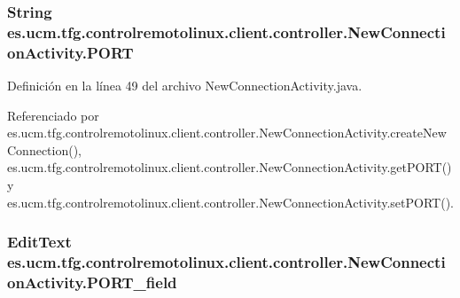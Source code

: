 \hypertarget{classes_1_1ucm_1_1tfg_1_1controlremotolinux_1_1client_1_1controller_1_1NewConnectionActivity_a28de48a3f946023e08bae98f988b16a9}{
\subsubsection[{P\-O\-R\-T}]{\setlength{\rightskip}{0pt plus 5cm}String es.\-ucm.\-tfg.\-controlremotolinux.\-client.\-controller.\-New\-Connection\-Activity.\-P\-O\-R\-T\hspace{0.3cm}{\ttfamily [private]}}}\label{classes_1_1ucm_1_1tfg_1_1controlremotolinux_1_1client_1_1controller_1_1NewConnectionActivity_a28de48a3f946023e08bae98f988b16a9}


Definición en la línea 49 del archivo New\-Connection\-Activity.\-java.



Referenciado por es.\-ucm.\-tfg.\-controlremotolinux.\-client.\-controller.\-New\-Connection\-Activity.\-create\-New\-Connection(), es.\-ucm.\-tfg.\-controlremotolinux.\-client.\-controller.\-New\-Connection\-Activity.\-get\-P\-O\-R\-T() y es.\-ucm.\-tfg.\-controlremotolinux.\-client.\-controller.\-New\-Connection\-Activity.\-set\-P\-O\-R\-T().

\hypertarget{classes_1_1ucm_1_1tfg_1_1controlremotolinux_1_1client_1_1controller_1_1NewConnectionActivity_abe571af8247d1ef78a0c0ed5edaf3308}{
\subsubsection[{P\-O\-R\-T\-\_\-field}]{\setlength{\rightskip}{0pt plus 5cm}Edit\-Text es.\-ucm.\-tfg.\-controlremotolinux.\-client.\-controller.\-New\-Connection\-Activity.\-P\-O\-R\-T\-\_\-field\hspace{0.3cm}{\ttfamily [private]}}}\label{classes_1_1ucm_1_1tfg_1_1controlremotolinux_1_1client_1_1controller_1_1NewConnectionActivity_abe571af8247d1ef78a0c0ed5edaf3308}


